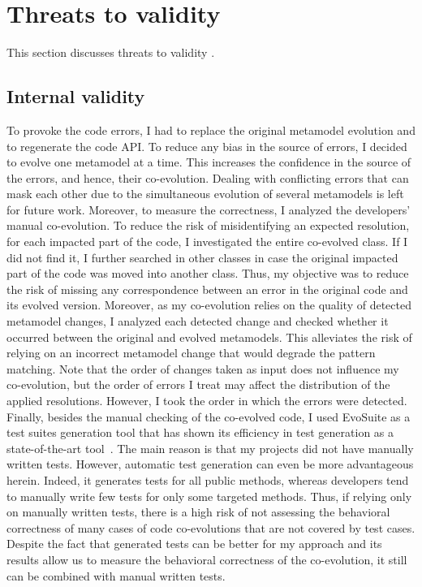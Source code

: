 \section{Threats to validity}\label{ch1_threat}
\noindent This section discusses threats to validity \cite{wohlin2012experimentation}.

\subsection{Internal validity} To provoke the code errors, I had to replace the original metamodel evolution and to regenerate the code API. To reduce any bias in the source of errors, I decided to evolve one metamodel at a time. This increases the confidence in the source of the errors, and hence, their co-evolution. Dealing with conflicting errors that can mask each other due to the simultaneous evolution of several metamodels is left for future work.  
Moreover, to measure the correctness, I analyzed the developers' manual co-evolution.
To reduce the risk of misidentifying an expected resolution, for each impacted part of the code, I investigated the entire co-evolved class. If I did not find it, I further searched in other classes in case the original impacted part of the code was moved into another class. Thus, my objective was to reduce the risk of missing any correspondence between an error in the original code and its evolved version. Moreover, as my co-evolution relies on the quality of detected metamodel changes, I analyzed each detected change and checked whether it occurred between the original and evolved metamodels. This alleviates the risk of relying on an incorrect metamodel change that would degrade the pattern matching. 
Note that the order of changes taken as input does not influence my co-evolution, but the order of errors I treat may affect the distribution of the applied resolutions. However, I took the order in which the errors were detected. 
Finally, besides the manual checking of the co-evolved code, I used EvoSuite as a test suites generation tool that has shown its efficiency in
test generation as a state-of-the-art tool~\cite{DANGLOT2019110398,https://doi.org/10.1002/stvr.1601}. The main reason is that my projects did not have manually written tests. However, automatic test
generation can even be more advantageous herein. Indeed, it generates tests for all
public methods, whereas developers tend to manually write few tests for only some targeted methods. Thus, if relying only on manually written tests, there is a high risk of not assessing the behavioral correctness of many cases of code co-evolutions that are not covered by test cases. Despite the fact that generated tests can be better for my approach and its results allow us to measure the behavioral correctness of the co-evolution, %
it still can be combined with manual written tests.


